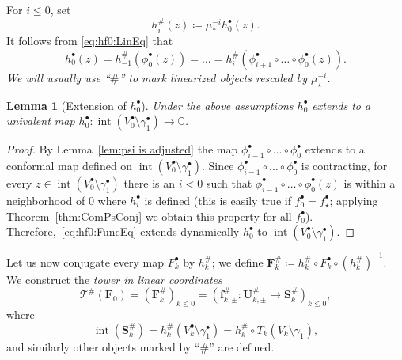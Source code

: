\documentclass[]{amsart}
\newcommand\TT{\mathcal{T}}
\newcommand\intr{\operatorname{int}}
\newcommand{\bF}{{\mathbf F}}
\newcommand{\bS}{{\mathbf S}}
\newcommand{\bU}{{\mathbf U}}
\newcommand{\bbf}{{\mathbf f}}
\newcommand{\str}{{\star}}
\newcommand{\C}{\mathbb{C}}
\newtheorem{lem}[thm]{Lemma}
\theoremstyle{remark}
\numberwithin{equation}{section}
\theoremstyle{definition}
\begin{document}
For $i\le 0$, set
\begin{equation}
\label{eq:defn:h harsh}
h_{i}^{\#} (z) \coloneqq   \mu^{-i}_* h^\bullet_{0}(z).
\end{equation}
It follows from \eqref{eq:hf0:LinEq} that 
\begin{equation}
\label{eq:hf0:FuncEq}
 h^\bullet_{0}(z)= h^\#_{-1}\left(\phi^{\bullet}_{0}(z) \right)=\dots=h^\#_{i} \left(   \phi^{\bullet}_{i+1}  \circ\dots \circ \phi^{\bullet}_{0}(z)\right).  \end{equation}
\emph{We will usually use ``$\#$'' to mark linearized objects rescaled by $\mu_\str^{-i}$.}

\begin{lem}[Extension of $h^\bullet_{0}$]
Under the above assumptions $h_0^{\bullet }$ 
extends to a univalent map $h_0^{\bullet }\colon \intr(V^\bullet_0\setminus \gamma^{\bullet}_1)\to \C$.
\end{lem}

\begin{proof}
 By Lemma~\ref{lem:psi is adjusted} the map $\phi^{\bullet}_{i-1}\circ \dots\circ \phi^{\bullet}_{0}$ extends to a conformal map defined on $\intr (V^\bullet_0\setminus \gamma^\bullet_1)$. Since $\phi^{\bullet}_{i-1}\circ \dots\circ  \phi^{\bullet}_{0}$  is contracting, for every $z\in \intr (V^\bullet_0\setminus \gamma^\bullet_1)$ there is an $i< 0$ such that $ \phi^{\bullet}_{i-1}  \circ\dots \circ \phi^{\bullet}_{0}(z)$ is within a neighborhood of $0$ where $h_{i} ^{\bullet }$ is defined (this is easily true if $f^\bullet_0=f^\bullet_\str$; applying Theorem~\ref{thm:ComPsConj} we obtain this property for all $f^\bullet_0$). Therefore,~\eqref{eq:hf0:FuncEq} extends dynamically $h^\bullet_{0}$ to $ \intr(V_0^\bullet \setminus \gamma^\bullet_1)$.
\end{proof}



Let us now conjugate every map $F_k^{\bullet }$ by $h_k^{\#}$; we define $\bF_k^{\# } \coloneqq h^{\# }_k \circ F_k^\bullet \circ \left(h^{\#}_k \right)^{-1}$.  We construct the \emph{tower in linear coordinates}
\begin{equation}
\label{eq:TowerTf0}
\TT^\# (\bF_0)= \left( \bF_{k}^{\#}\right)_{k\le 0} =\left( \bbf^{\# }_{k,\pm }\colon \bU^{\# }_{k,\pm}\to \bS_{k}^{\# }   \right)_{k\le 0},
\end{equation}
where
\begin{equation}
\label{eq:dfn:Ssharp} 
\intr\left(\bS^{\#}_{k}\right)= h^{\#}_{k}\left(V^{\bullet }_k \setminus \gamma^\bullet_1  \right)=h^{\#}_{k}\circ T_k\left(V_k \setminus \gamma_1  \right),
\end{equation}
and similarly other objects marked by ``$\#$'' are defined.
\end{document}
